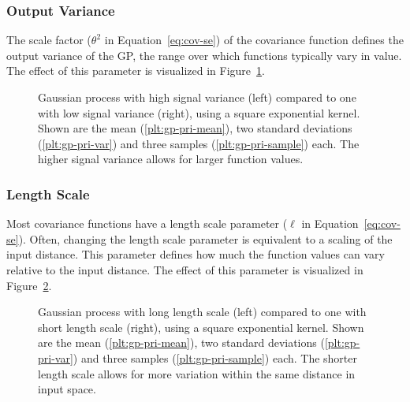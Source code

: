 \subsubsection{Output Variance}

The scale factor ($\theta^2$ in Equation~\eqref{eq:cov-se}) of the covariance
function defines the output variance of the GP, \ie the range over which
functions typically vary in value. The effect of this parameter is visualized
in Figure~\ref{fig:different-signal-variances}.

\pagebreak[4]

\begin{figure}
  \setlength{}%
  \setlength\figureheight{0.618\figurewidth}%
  \caption[Gaussian process with high/low signal variance.]{Gaussian process
with high signal variance (left) compared to one with low signal variance
(right), using a square exponential kernel. Shown are the mean
(\ref*{plt:gp-pri-mean}), two standard deviations
(\ref*{plt:gp-pri-var}) and three samples (\ref*{plt:gp-pri-sample}) each. The
higher signal variance allows for larger function values.}
  \label{fig:different-signal-variances}
\end{figure}

\subsubsection{Length Scale}

Most covariance functions have a length scale parameter ($\ell$ in
Equation~\eqref{eq:cov-se}). Often, changing the length scale parameter is
equivalent to a scaling of the input distance. This parameter defines how much
the function values can vary relative to the input distance. The effect of this
parameter is visualized in Figure~\ref{fig:different-length-scales}.

\begin{figure}
  \setlength{}%
  \setlength\figureheight{0.618\figurewidth}%
  \caption[Gaussian process with long/short length scale.]{Gaussian process
with long length scale (left) compared to one with short length scale (right),
using a square exponential kernel.
Shown are the mean (\ref*{plt:gp-pri-mean}), two standard deviations
(\ref*{plt:gp-pri-var}) and three samples (\ref*{plt:gp-pri-sample}) each. The
shorter length scale allows for more variation within the same distance in input
space.}
  \label{fig:different-length-scales}
\end{figure}

